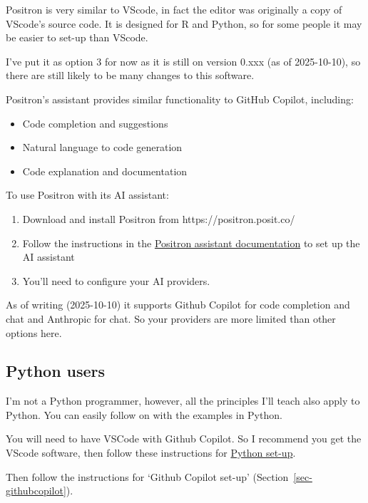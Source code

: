 \documentclass[
  letterpaper,
  DIV=11,
  numbers=noendperiod]{scrreprt}
\providecommand{\tightlist}{%
  \setlength{\itemsep}{0pt}\setlength{\parskip}{0pt}}
\begin{document}
Positron is very similar to VScode, in fact the editor was originally a
copy of VScode's source code. It is designed for R and Python, so for
some people it may be easier to set-up than VScode.

I've put it as option 3 for now as it is still on version 0.xxx (as of
2025-10-10), so there are still likely to be many changes to this
software.

Positron's assistant provides similar functionality to GitHub Copilot,
including:

\begin{itemize}
\tightlist
\item
  Code completion and suggestions
\item
  Natural language to code generation
\item
  Code explanation and documentation
\end{itemize}

To use Positron with its AI assistant:

\begin{enumerate}
\def\labelenumi{\arabic{enumi}.}
\tightlist
\item
  Download and install Positron from https://positron.posit.co/
\item
  Follow the instructions in the
  \href{https://positron.posit.co/assistant.html}{Positron assistant
  documentation} to set up the AI assistant
\item
  You'll need to configure your AI providers.
\end{enumerate}

As of writing (2025-10-10) it supports Github Copilot for code
completion and chat and Anthropic for chat. So your providers are more
limited than other options here.

\subsection{Python users}\label{python-users}

I'm not a Python programmer, however, all the principles I'll teach also
apply to Python. You can easily follow on with the examples in Python.

You will need to have VSCode with Github Copilot. So I recommend you get
the VScode software, then follow these instructions for
\href{https://code.visualstudio.com/docs/python/python-tutorial}{Python
set-up}.

Then follow the instructions for `Github Copilot set-up'
(Section~\ref{sec-githubcopilot}).
\end{document}
